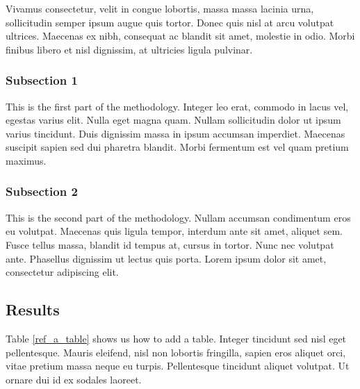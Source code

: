 \documentclass[11pt,letterpaper,]{article}
\begin{document}
Vivamus consectetur, velit in congue lobortis, massa massa lacinia urna,
sollicitudin semper ipsum augue quis tortor. Donec quis nisl at arcu
volutpat ultrices. Maecenas ex nibh, consequat ac blandit sit amet,
molestie in odio. Morbi finibus libero et nisl dignissim, at ultricies
ligula pulvinar.

\subsubsection{Subsection 1}\label{subsection-1-1}

This is the first part of the methodology. Integer leo erat, commodo in
lacus vel, egestas varius elit. Nulla eget magna quam. Nullam
sollicitudin dolor ut ipsum varius tincidunt. Duis dignissim massa in
ipsum accumsan imperdiet. Maecenas suscipit sapien sed dui pharetra
blandit. Morbi fermentum est vel quam pretium maximus.

\subsubsection{Subsection 2}\label{subsection-2-2}

This is the second part of the methodology. Nullam accumsan condimentum
eros eu volutpat. Maecenas quis ligula tempor, interdum ante sit amet,
aliquet sem. Fusce tellus massa, blandit id tempus at, cursus in tortor.
Nunc nec volutpat ante. Phasellus dignissim ut lectus quis porta. Lorem
ipsum dolor sit amet, consectetur adipiscing elit.

\subsection{Results}\label{results-2}

Table \ref{ref_a_table} shows us how to add a table. Integer tincidunt
sed nisl eget pellentesque. Mauris eleifend, nisl non lobortis
fringilla, sapien eros aliquet orci, vitae pretium massa neque eu
turpis. Pellentesque tincidunt aliquet volutpat. Ut ornare dui id ex
sodales laoreet.

\newpage
\end{document}
